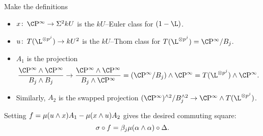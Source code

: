 \begin{lemma}
Make the definitions
\begin{itemize}
\item \(x\co \CP^\infty \to \Susp^2 kU\) is the \(kU\)--Euler class for \((1 - \L)\).
\item \(u\co T(\L^{\otimes p^j}) \to kU^2\) is the \(kU\)--Thom class for \(T(\L^{\otimes p^j}) = \CP^\infty / B_j\).
\item \(A_1\) is the projection \[\frac{\CP^\infty \sm \CP^\infty}{B_j \sm B_j} \to \frac{\CP^\infty \sm \CP^\infty}{B_j \sm \CP^\infty} = (\CP^\infty / B_j) \sm \CP^\infty = T(\L^{\otimes p^j}) \sm \CP^\infty.\]
\item Similarly, \(A_2\) is the swapped projection \((\CP^\infty)^{\sm 2} / B_j^{\sm 2} \to \CP^\infty \sm T(\L^{\otimes p^j})\).
\end{itemize}
Setting \(f = \mu(u \wedge x) A_1 - \mu(x \wedge u) A_2\) gives the desired commuting square: \[\sigma \circ f = \beta_j \mu(\alpha \wedge \alpha) \circ \Delta.\]
\end{lemma}
